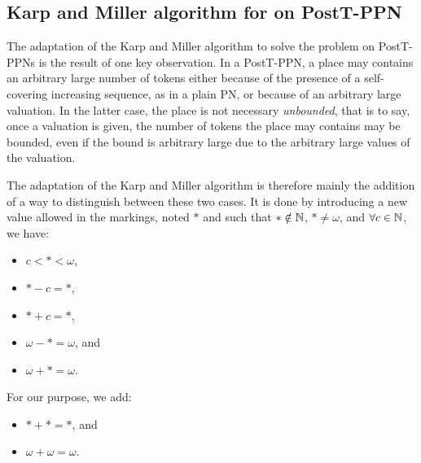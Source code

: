 \subsection{Karp and Miller algorithm for \Ecov on PostT-\ac{PPN}}

The adaptation of the Karp and Miller algorithm to solve the \Ecov problem on PostT-\acp{PPN} is the result of one key observation.
In a PostT-\ac{PPN}, a place may contains an arbitrary large number of tokens either because of the presence of a self-covering increasing sequence, as in a plain \ac{PN}, or because of an arbitrary large valuation.
In the latter case, the place is not necessary \emph{unbounded}, that is to say, once a valuation is given, the number of tokens the place may contains may be bounded, even if the bound is arbitrary large due to the arbitrary large values of the valuation.

The adaptation of the Karp and Miller algorithm is therefore mainly the addition of a way to distinguish between these two cases.
It is done by introducing a new value allowed in the markings, noted $*$ and such that $* \notin \mathbb{N}$, $* \neq \omega$, and $\forall c \in \mathbb{N}$, we have:
\begin{itemize}
  \item $c < * < \omega$,
  \item $* - c = *$,
  \item $* + c = *$,
  \item $\omega - * = \omega$, and
  \item $\omega + * = \omega$.
\end{itemize}

For our purpose, we add: 
\begin{itemize}
  \item $* + * = *$, and
  \item $\omega + \omega = \omega$.
\end{itemize}

